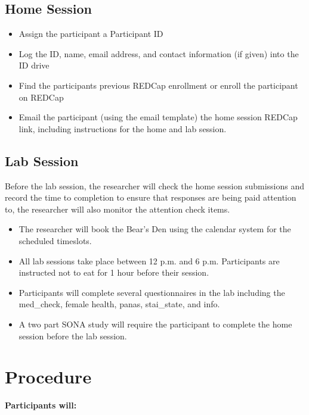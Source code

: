 \documentclass[]{book}
\providecommand{\tightlist}{%
  \setlength{\itemsep}{0pt}\setlength{\parskip}{0pt}}
\begin{document}
\hypertarget{home-session}{%
\subsection{Home Session}\label{home-session}}

\begin{itemize}
\tightlist
\item
  Assign the participant a Participant ID
\item
  Log the ID, name, email address, and contact information (if given) into the ID drive
\item
  Find the participants previous REDCap enrollment or enroll the participant on REDCap
\item
  Email the participant (using the email template) the home session REDCap link, including instructions for the home and lab session.
\end{itemize}

\hypertarget{lab-session}{%
\subsection{Lab Session}\label{lab-session}}

Before the lab session, the researcher will check the home session submissions and record the time to completion to ensure that responses are being paid attention to, the researcher will also monitor the attention check items.

\begin{itemize}
\item
  The researcher will book the Bear's Den using the calendar system for the scheduled timeslots.
\item
  All lab sessions take place between 12 p.m. and 6 p.m. Participants are instructed not to eat for 1 hour before their session.
\item
  Participants will complete several questionnaires in the lab including the med\_check, female health, panas, stai\_state, and info.
\item
  A two part SONA study will require the participant to complete the home session before the lab session.
\end{itemize}

\hypertarget{procedure-2}{%
\section{Procedure}\label{procedure-2}}

\textbf{Participants will:}
\end{document}
